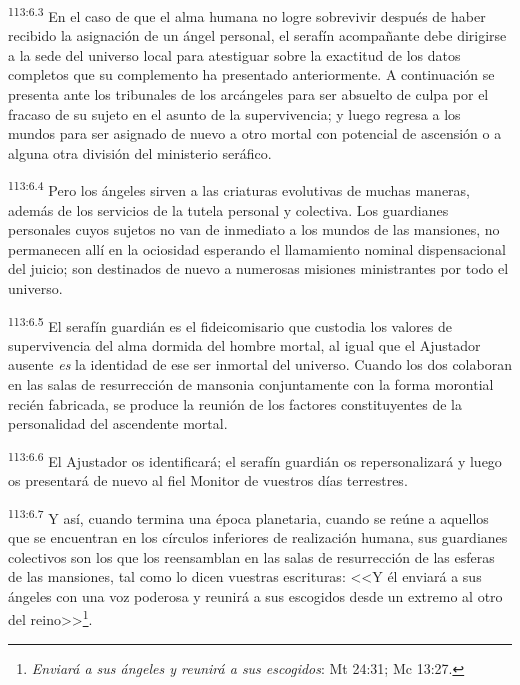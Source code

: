 \par
\textsuperscript{113:6.3} En el caso de que el alma humana no logre sobrevivir después de haber recibido la asignación de un ángel personal, el serafín acompañante debe dirigirse a la sede del universo local para atestiguar sobre la exactitud de los datos completos que su complemento ha presentado anteriormente. A continuación se presenta ante los tribunales de los arcángeles para ser absuelto de culpa por el fracaso de su sujeto en el asunto de la supervivencia; y luego regresa a los mundos para ser asignado de nuevo a otro mortal con potencial de ascensión o a alguna otra división del ministerio seráfico.

\par
\textsuperscript{113:6.4} Pero los ángeles sirven a las criaturas evolutivas de muchas maneras, además de los servicios de la tutela personal y colectiva. Los guardianes personales cuyos sujetos no van de inmediato a los mundos de las mansiones, no permanecen allí en la ociosidad esperando el llamamiento nominal dispensacional del juicio; son destinados de nuevo a numerosas misiones ministrantes por todo el universo.

\par
\textsuperscript{113:6.5} El serafín guardián es el fideicomisario que custodia los valores de supervivencia del alma dormida del hombre mortal, al igual que el Ajustador ausente \textit{es} la identidad de ese ser inmortal del universo. Cuando los dos colaboran en las salas de resurrección de mansonia conjuntamente con la forma morontial recién fabricada, se produce la reunión de los factores constituyentes de la personalidad del ascendente mortal.

\par
\textsuperscript{113:6.6} El Ajustador os identificará; el serafín guardián os repersonalizará y luego os presentará de nuevo al fiel Monitor de vuestros días terrestres.

\par
\textsuperscript{113:6.7} Y así, cuando termina una época planetaria, cuando se reúne a aquellos que se encuentran en los círculos inferiores de realización humana, sus guardianes colectivos son los que los reensamblan en las salas de resurrección de las esferas de las mansiones, tal como lo dicen vuestras escrituras: <<Y él enviará a sus ángeles con una voz poderosa y reunirá a sus escogidos desde un extremo al otro del reino>>\footnote{\textit{Enviará a sus ángeles y reunirá a sus escogidos}: Mt 24:31; Mc 13:27.}.

